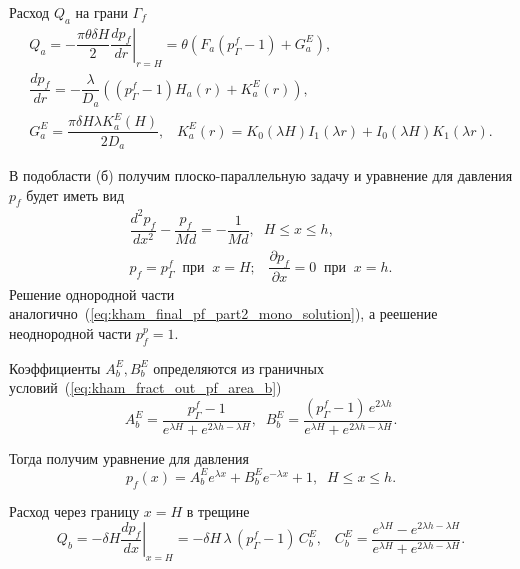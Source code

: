 \documentclass{article}
\newcommand{\mysub}[1]{%
  \par\vspace{0.5em}\noindent{\normalsize\underline{#1}}\par\vspace{0.5em}%
}
\begin{document}
Расход $Q_a$ на грани $\Gamma_f$
\begin{equation}
\displaystyle
\begin{gathered}
Q_a = - \dfrac{\pi \theta \delta H}{2} \left.\dfrac{d p_f}{d r}\right|_{r=H} =
\theta \left(    F_a \left(p^f_{\Gamma} - 1\right) + G_a^E \right), \\[8pt]
\dfrac{d p_f}{d r} =
- \dfrac{\lambda}{D_a} \left( \left(p^f_{\Gamma} - 1 \right) H_a \left(r\right) + K_a^E \left(r \right) \right), \\[8pt]
G_a^E = \dfrac{\pi \delta H \lambda K_a^E (H)}{2 D_a}, \;\;\;
K_a^E \left(r\right) = K_0\left(\lambda H\right)I_1\left(\lambda r\right) + I_0\left(\lambda H\right)K_1\left(\lambda r\right).
\end{gathered}
\label{eq:kham_fract_outer_qa}
\end{equation}

\mysub{Подобласть (б) $H \leq x \leq h$}
В подобласти (б) получим плоско-параллельную задачу и уравнение для давления $p_f$ будет иметь вид
\begin{equation}
\displaystyle
\begin{gathered}
\dfrac{d^2 p_f}{dx^2}-\dfrac{p_f}{Md}=-\dfrac{1}{Md}, \;\; H \leq x \leq h, \\[8pt]
p_f = p^f_{\Gamma}  \;\; \text{при} \;\; x = H; \;\;\; \dfrac{\partial p_f}{\partial x} = 0 \;\; \text{при} \;\; x = h.
\end{gathered}
\label{eq:kham_fract_out_pf_area_b}
\end{equation}
Решение однородной части аналогично~(\ref{eq:kham_final_pf_part2_mono_solution}), а реешение неоднородной части $p_f^p = 1$.

Коэффициенты $A_b^E, B_b^E$ определяются из граничных условий~(\ref{eq:kham_fract_out_pf_area_b})
\begin{equation}
\displaystyle
A_b^E = \frac{p_\Gamma^f - 1}{e^{\lambda H} + e^{2 \lambda h - \lambda H}}, \;\;
B_b^E = \frac{(p_\Gamma^f - 1) \, e^{2 \lambda h}}{e^{\lambda H} + e^{2 \lambda h - \lambda H}}.
\label{eq:kham_fract_out_area_b_AB}
\end{equation}

Тогда получим уравнение для давления
\begin{equation}
\displaystyle
p_f(x) = A_b^E e^{\lambda x} + B_b^E e^{-\lambda x} + 1, \;\;
H \leq x \leq h.
\label{eq:kham_fract_out_final_press_area_b}
\end{equation}

Расход через границу $x=H$ в трещине
\begin{equation}
\displaystyle
Q_b = - \delta H \left. \frac{d p_f}{d x} \right|_{x=H} = - \delta H \, \lambda \, (p_\Gamma^f - 1) \, C_b^E, \;\;\;
C_b^E = \frac{e^{\lambda H} - e^{2 \lambda h - \lambda H}}{e^{\lambda H} + e^{2 \lambda h - \lambda H}}.
\label{eq:rate_x_H}
\end{equation}
\end{document}
